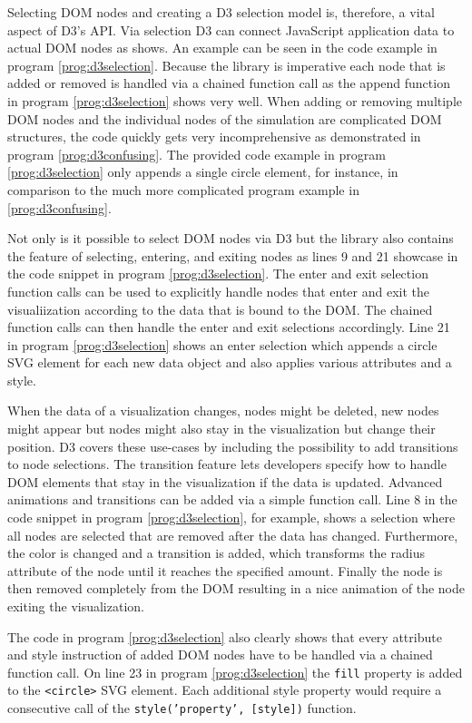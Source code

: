 Selecting DOM nodes and creating a D3 selection model is, therefore, a vital aspect of D3's API. Via selection D3 can connect JavaScript application data to actual DOM nodes as \cite{D3Github} shows. An example can be seen in the code example in program \ref{prog:d3selection}. Because the library is imperative each node that is added or removed is handled via a chained function call as the append function in program \ref{prog:d3selection} shows very well. When adding or removing multiple DOM nodes and the individual nodes of the simulation are complicated DOM structures, the code quickly gets very incomprehensive as demonstrated in program \ref{prog:d3confusing}. The provided code example in program \ref{prog:d3selection} only appends a single circle element, for instance, in comparison to the much more complicated program example in \ref{prog:d3confusing}. 

Not only is it possible to select DOM nodes via D3 but the library also contains the feature of selecting, entering, and exiting nodes as lines 9 and 21 showcase in the code snippet in program \ref{prog:d3selection}. The enter and exit selection function calls can be used to explicitly handle nodes that enter and exit the visualiization according to the data that is bound to the DOM. The chained function calls can then handle the enter and exit selections accordingly. Line 21 in program \ref{prog:d3selection} shows an enter selection which appends a circle SVG element for each new data object and also applies various attributes and a style.

When the data of a visualization changes, nodes might be deleted, new nodes might appear but nodes might also stay in the visualization but change their position. D3 covers these use-cases by including the possibility to add transitions to node selections. The transition feature lets developers specify how to handle DOM elements that stay in the visualization if the data is updated. Advanced animations and transitions can be added via a simple function call. Line 8 in the code snippet in program \ref{prog:d3selection}, for example, shows a selection where all nodes are selected that are removed after the data has changed. Furthermore, the color is changed and a transition is added, which transforms the radius attribute of the node until it reaches the specified amount. Finally the node is then removed completely from the DOM resulting in a nice animation of the node exiting the visualization.

The code in program \ref{prog:d3selection} also clearly shows that every attribute and style instruction of added DOM nodes have to be handled via a chained function call. On line 23 in program \ref{prog:d3selection} the \texttt{fill} property is added to the \texttt{<circle>} SVG element. Each additional style property would require a consecutive call of the \texttt{style('property', [style])} function.

